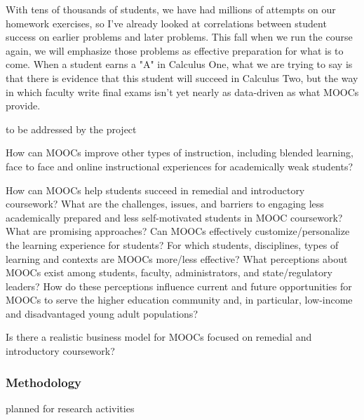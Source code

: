 \documentclass[12pt]{article}
\begin{document}
With tens of thousands of students, we have had millions of attempts
on our homework exercises, so I've already looked at correlations
between student success on earlier problems and later problems.  This
fall when we run the course again, we will emphasize those problems as
effective preparation for what is to come.  When a student earns a "A"
in Calculus One, what we are trying to say is that there is evidence
that this student will succeed in Calculus Two, but the way in which
faculty write final exams isn't yet nearly as data-driven as what
MOOCs provide.

to be addressed by the project

How can MOOCs improve other types of instruction, including blended learning, face to face and online instructional experiences for academically weak students?

    How can MOOCs help students succeed in remedial and introductory coursework?
    What are the challenges, issues, and barriers to engaging less academically prepared and less self-motivated students in MOOC coursework? What are promising approaches?
    Can MOOCs effectively customize/personalize the learning experience for students?
    For which students, disciplines, types of learning and contexts are MOOCs more/less effective?
    What perceptions about MOOCs exist among students, faculty, administrators, and state/regulatory leaders? How do these perceptions influence current and future opportunities for MOOCs to serve the higher education community and, in particular, low-income and disadvantaged young adult populations?

Is there a realistic business model for MOOCs focused on remedial and introductory coursework?

\subsubsection*{Methodology}

 planned for research activities
\end{document}
